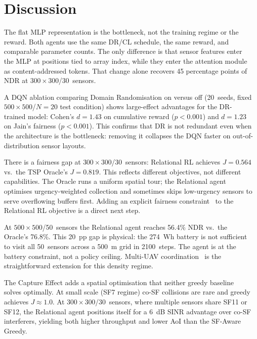 \documentclass[conference]{IEEEtran}
\begin{document}
\section{Discussion}

The flat MLP representation is the bottleneck, not the training regime or the reward. Both agents use the same DR/CL schedule, the same reward, and comparable parameter counts. The only difference is that sensor features enter the MLP at positions tied to array index, while they enter the attention module as content-addressed tokens. That change alone recovers 45 percentage points of NDR at $300{\times}300$/30~sensors.

A DQN ablation comparing Domain Randomisation on versus off (20~seeds, fixed $500{\times}500$/$N{=}20$ test condition) shows large-effect advantages for the DR-trained model: Cohen's $d{=}1.43$ on cumulative reward ($p{<}0.001$) and $d{=}1.23$ on Jain's fairness ($p{<}0.001$). This confirms that DR is not redundant even when the architecture is the bottleneck: removing it collapses the DQN faster on out-of-distribution sensor layouts.

There is a fairness gap at $300{\times}300$/30~sensors: Relational RL achieves $J{=}0.564$ vs.\ the TSP Oracle's $J{=}0.819$. This reflects different objectives, not different capabilities. The Oracle runs a uniform spatial tour; the Relational agent optimises urgency-weighted collection and sometimes skips low-urgency sensors to serve overflowing buffers first. Adding an explicit fairness constraint~\cite{jain1984quantitative,lee2025quasi,nemer2022energyefficient} to the Relational RL objective is a direct next step.

At $500{\times}500$/50~sensors the Relational agent reaches 56.4\% NDR vs.\ the Oracle's 76.8\%. This 20~pp gap is physical: the 274~Wh battery is not sufficient to visit all 50~sensors across a 500~m grid in 2100~steps. The agent is at the battery constraint, not a policy ceiling. Multi-UAV coordination~\cite{lee2025quasi,ahmed2026marl,bayerlein2020uav} is the straightforward extension for this density regime.

The Capture Effect adds a spatial optimisation that neither greedy baseline solves optimally. At small scale (SF7 regime) co-SF collisions are rare and greedy achieves $J{\approx}1.0$. At $300{\times}300$/30~sensors, where multiple sensors share SF11 or SF12, the Relational agent positions itself for a 6~dB SINR advantage over co-SF interferers, yielding both higher throughput and lower AoI than the SF-Aware Greedy.
\end{document}
